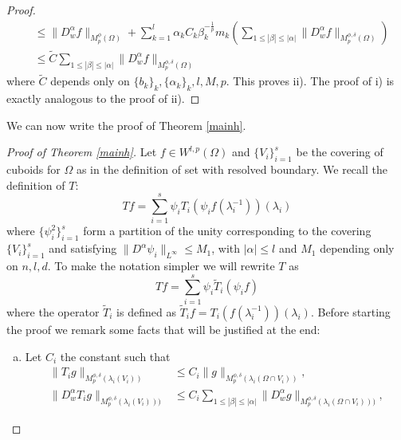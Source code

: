 \documentclass[12pt]{article}
\theoremstyle{definition}
\begin{document}
\begin{proof}
\begin{align*}
									&\le \|D^\alpha_w f \|_{M_p^\phi(\Omega)}+\sum_{k=1}^l \alpha_kC_k\beta_k^{-\frac{1}{p}}m_k \left( \sum_{1\le |\beta|\le|\alpha| }\| D^\alpha_wf\|_{M_p^{\phi,\delta}(\Omega)} \right) \\
									& \le \widetilde C\sum_{1\le |\beta|\le|\alpha| }\| D^\alpha_wf\|_{M_p^{\phi,\delta}(\Omega)}
\end{align*}
where $\widetilde C$ depends only on $\{b_k\}_k,\{\alpha_k\}_k,l,M,p$. This proves ii). The proof of i) is exactly analogous to the proof of ii).
\end{proof}
		



We can now write the proof of Theorem \ref{mainh}.

\begin{proof}[Proof of Theorem \ref{mainh}]
Let $f \in W^{l,p}(\Omega)$ and  $\{V_i\}_{i=1}^s$ be the covering of cuboids for $\Omega$ as in the definition of set with resolved boundary. We recall the definition of $T:$
\[ Tf = \sum_{i=1}^s \psi_iT_i(\psi_if(\lambda_i^{-1}))(\lambda_i)\]
where $\{ \psi^2_i \}_{i=1}^s$ form a partition of the unity corresponding to the covering $\{V_i\}_{i=1}^s$ and satisfying $\|D^\alpha \psi_i \|_{L^\infty}\le M_1$, with $|\alpha|\le l$ and $M_1$ depending only on $n,l,d$. To make the notation simpler we will rewrite $T$ as
\[ Tf = \sum_{i=1}^s \psi_i\widetilde T_i(\psi_if)\]
where the operator $\widetilde T_i$ is defined as $\widetilde T_i f = T_i(f(\lambda_i^{-1}))(\lambda_i)$. 
Before starting the proof we remark some facts that will be justified at the end:
\begin{enumerate}[a)]

\item Let $C_i$ the constant such that
\begin{align*}
\| T_ig\|_{M_p^{\phi,\delta}(\lambda_i(V_i))}&\le C_i \|g\|_{M_p^{\phi,\delta}(\lambda_i(\Omega \cap V_i))},\\
\| D^\alpha_w T_ig\|_{M_p^{\phi,\delta}(\lambda_i(V_i)))} &\le   C_i\sum_{1\le |\beta|\le|\alpha| }\| D^\alpha_wg\|_{M_p^{\phi,\delta}(\lambda_i(\Omega \cap V_i)))},
\end{align*}



\end{enumerate}
\end{proof}
\end{document}
